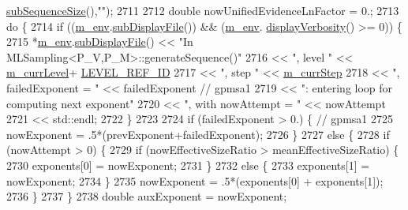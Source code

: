\begin{DoxyCode}
      \hyperlink{class_q_u_e_s_o_1_1_scalar_sequence_a0288ea295eedc216a1617b3286f6f3a0}{subSequenceSize}(),\textcolor{stringliteral}{""});
2711 
2712       \textcolor{keywordtype}{double} nowUnifiedEvidenceLnFactor = 0.;
2713       \textcolor{keywordflow}{do} \{
2714         \textcolor{keywordflow}{if} ((\hyperlink{class_q_u_e_s_o_1_1_m_l_sampling_a13f1ca4fe9f94822fe572a743eaced1d}{m\_env}.\hyperlink{class_q_u_e_s_o_1_1_base_environment_a8a0064746ae8dddfece4229b9ad374d6}{subDisplayFile}()) && (\hyperlink{class_q_u_e_s_o_1_1_m_l_sampling_a13f1ca4fe9f94822fe572a743eaced1d}{m\_env}.
      \hyperlink{class_q_u_e_s_o_1_1_base_environment_a1fe5f244fc0316a0ab3e37463f108b96}{displayVerbosity}() >= 0)) \{
2715           *\hyperlink{class_q_u_e_s_o_1_1_m_l_sampling_a13f1ca4fe9f94822fe572a743eaced1d}{m\_env}.\hyperlink{class_q_u_e_s_o_1_1_base_environment_a8a0064746ae8dddfece4229b9ad374d6}{subDisplayFile}() << \textcolor{stringliteral}{"In MLSampling<P\_V,P\_M>::generateSequence()"}
2716                                   << \textcolor{stringliteral}{", level "} << \hyperlink{class_q_u_e_s_o_1_1_m_l_sampling_af9416874c856e50f3b35270e801f17e4}{m\_currLevel}+
      \hyperlink{_m_l_sampling_level_options_8h_a68d15eaf394d210effcf584b938206d3}{LEVEL\_REF\_ID}
2717                                   << \textcolor{stringliteral}{", step "}  << \hyperlink{class_q_u_e_s_o_1_1_m_l_sampling_a1b1f8ccb4823bdfa26ec652f0807c63e}{m\_currStep}
2718                                   << \textcolor{stringliteral}{", failedExponent = "} << failedExponent \textcolor{comment}{// gpmsa1}
2719                                   << \textcolor{stringliteral}{": entering loop for computing next exponent"}
2720                                   << \textcolor{stringliteral}{", with nowAttempt = "} << nowAttempt
2721                                   << std::endl;
2722         \}
2723 
2724         \textcolor{keywordflow}{if} (failedExponent > 0.) \{ \textcolor{comment}{// gpmsa1}
2725           nowExponent = .5*(prevExponent+failedExponent);
2726         \}
2727         \textcolor{keywordflow}{else} \{
2728           \textcolor{keywordflow}{if} (nowAttempt > 0) \{
2729             \textcolor{keywordflow}{if} (nowEffectiveSizeRatio > meanEffectiveSizeRatio) \{
2730               exponents[0] = nowExponent;
2731             \}
2732             \textcolor{keywordflow}{else} \{
2733               exponents[1] = nowExponent;
2734             \}
2735             nowExponent = .5*(exponents[0] + exponents[1]);
2736           \}
2737         \}
2738         \textcolor{keywordtype}{double} auxExponent = nowExponent;

\end{DoxyCode}

